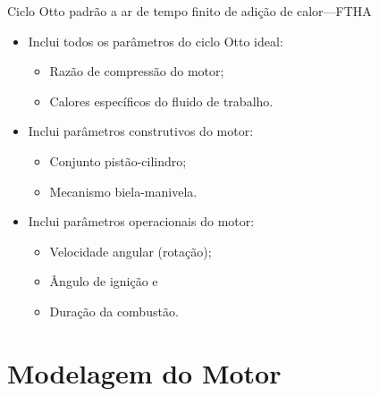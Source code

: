     \begin{frame}{Ciclo Otto padrão a ar de tempo finito de adição de calor---FTHA}\vspace*{-2em}
        \begin{itemize}
            \item<1->  Inclui todos os parâmetros do \alert{ciclo Otto ideal}:
            \begin{itemize}
                \item<2->  \alert{Razão de compressão} do motor;
                \item<3->  \alert{Calores específicos} do fluido de trabalho.
            \end{itemize}
            \item<4->  Inclui parâmetros \alert{construtivos} do \alert{motor}:
            \begin{itemize}
                \item<5->  Conjunto \alert{pistão-cilindro};
                \item<6->  Mecanismo \alert{biela-manivela}.
            \end{itemize}
            \item<7->  Inclui parâmetros \alert{operacionais} do \alert{motor}:
            \begin{itemize}
                \item<8->  \alert{Velocidade angular} (rotação);
                \item<9->  Ângulo de \alert{ignição} e
                \item<10-> \alert{Duração da combustão}.
            \end{itemize}
        \end{itemize}
    \end{frame}

\section{Modelagem do Motor}

